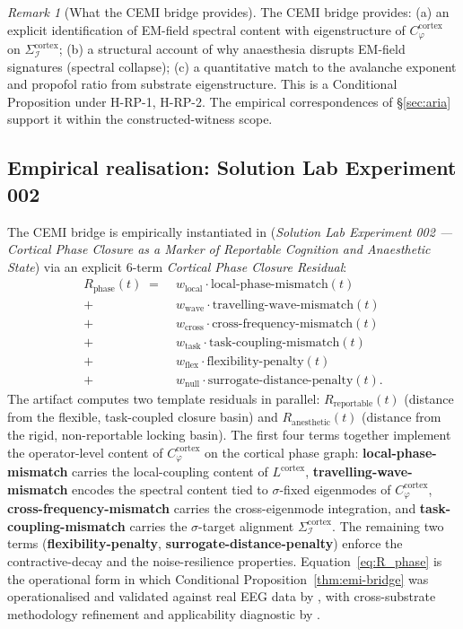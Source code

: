 \documentclass[11pt]{article}
\theoremstyle{plain}
\theoremstyle{definition}
\theoremstyle{remark}
\newtheorem{remark}[theorem]{Remark}
\newcommand{\Ical}{\mathcal{I}}
\newcommand{\Cph}{C_\varphi}
\begin{document}
\begin{remark}[What the CEMI bridge provides]\label{rem:emi-bridge-content}
The CEMI bridge provides: (a) an explicit identification of EM-field spectral content with eigenstructure of $\Cph^{\mathrm{cortex}}$ on $\Sigma_\Ical^{\mathrm{cortex}}$; (b) a structural account of why anaesthesia disrupts EM-field signatures (spectral collapse); (c) a quantitative match to the avalanche exponent and propofol ratio from substrate eigenstructure. This is a Conditional Proposition under H-RP-1, H-RP-2. The empirical correspondences of \S\ref{sec:aria} support it within the constructed-witness scope.
\end{remark}

\subsection{Empirical realisation: Solution Lab Experiment 002}\label{sec:cemi-solution-lab}

The CEMI bridge is empirically instantiated in \citet{SolutionLab002} (\emph{Solution Lab Experiment 002 --- Cortical Phase Closure as a Marker of Reportable Cognition and Anaesthetic State}) via an explicit 6-term \emph{Cortical Phase Closure Residual}:
\begin{equation}\label{eq:R_phase}
\begin{aligned}
R_{\mathrm{phase}}(t) \;=\;
& w_{\mathrm{local}} \cdot \text{local-phase-mismatch}(t) \\
+ \;& w_{\mathrm{wave}}  \cdot \text{travelling-wave-mismatch}(t) \\
+ \;& w_{\mathrm{cross}} \cdot \text{cross-frequency-mismatch}(t) \\
+ \;& w_{\mathrm{task}}  \cdot \text{task-coupling-mismatch}(t) \\
+ \;& w_{\mathrm{flex}}  \cdot \text{flexibility-penalty}(t) \\
+ \;& w_{\mathrm{null}}  \cdot \text{surrogate-distance-penalty}(t).
\end{aligned}
\end{equation}
The artifact computes two template residuals in parallel: $R_{\mathrm{reportable}}(t)$ (distance from the flexible, task-coupled closure basin) and $R_{\mathrm{anesthetic}}(t)$ (distance from the rigid, non-reportable locking basin). The first four terms together implement the operator-level content of $\Cph^{\mathrm{cortex}}$ on the cortical phase graph: \textbf{local-phase-mismatch} carries the local-coupling content of $L^{\mathrm{cortex}}$, \textbf{travelling-wave-mismatch} encodes the spectral content tied to $\sigma$-fixed eigenmodes of $\Cph^{\mathrm{cortex}}$, \textbf{cross-frequency-mismatch} carries the cross-eigenmode integration, and \textbf{task-coupling-mismatch} carries the $\sigma$-target alignment $\Sigma_\Ical^{\mathrm{cortex}}$. The remaining two terms (\textbf{flexibility-penalty}, \textbf{surrogate-distance-penalty}) enforce the contractive-decay and the noise-resilience properties. Equation~\eqref{eq:R_phase} is the operational form in which Conditional Proposition~\ref{thm:emi-bridge} was operationalised and validated against real EEG data by \citet{SolutionLab002}, with cross-substrate methodology refinement and applicability diagnostic by \citet{SmartClosureDistance}.
\end{document}
